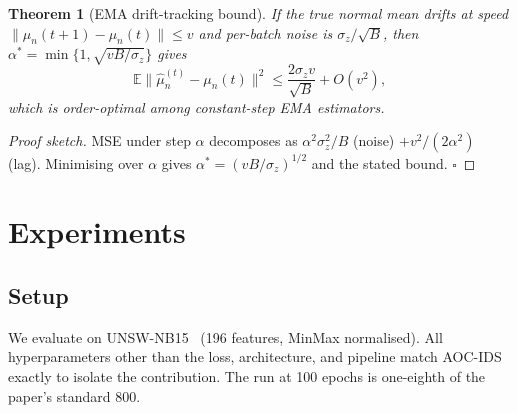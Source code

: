 \documentclass[conference]{IEEEtran}
\newtheorem{theorem}{Theorem}
\begin{document}
\begin{theorem}[EMA drift-tracking bound]\label{thm:ema}
If the true normal mean drifts at speed $\|\mu_n(t+1) - \mu_n(t)\| \le v$
and per-batch noise is $\sigma_z/\sqrt{B}$, then
$\alpha^* = \min\{1, \sqrt{vB/\sigma_z}\}$ gives
\begin{equation}
\mathbb{E}\|\hat\mu_n^{(t)} - \mu_n(t)\|^2 \le \frac{2\sigma_z v}{\sqrt{B}} + O(v^2),
\label{eq:ema-bound}
\end{equation}
which is order-optimal among constant-step EMA estimators.
\end{theorem}

\begin{proof}[Proof sketch]
MSE under step $\alpha$ decomposes as $\alpha^2\sigma_z^2/B$ (noise) $+
v^2/(2\alpha^2)$ (lag). Minimising over $\alpha$ gives $\alpha^* =
(vB/\sigma_z)^{1/2}$ and the stated bound. $\square$
\end{proof}

\section{Experiments}

\subsection{Setup}

We evaluate on UNSW-NB15~\cite{moustafa2015unsw} (196 features, MinMax
normalised). All hyperparameters other than the loss, architecture, and
pipeline match AOC-IDS exactly to isolate the contribution.
The run at 100 epochs is one-eighth of the paper's standard 800.
\end{document}
